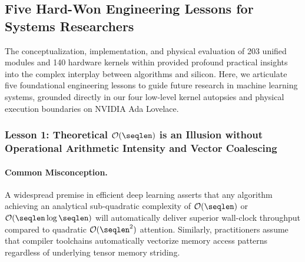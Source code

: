 \subsection{Five Hard-Won Engineering Lessons for Systems Researchers}
\label{subsec:engineering_lessons}

The conceptualization, implementation, and physical evaluation of 203 unified modules and 140 hardware kernels within \neuralops{} provided profound practical insights into the complex interplay between algorithms and silicon.
Here, we articulate five foundational engineering lessons to guide future research in machine learning systems, grounded directly in our four low-level kernel autopsies and physical execution boundaries on NVIDIA Ada Lovelace.

\subsubsection{Lesson 1: Theoretical $\mathcal{O}(\seqlen)$ is an Illusion without Operational Arithmetic Intensity and Vector Coalescing}
\label{subsubsec:lesson1}

\paragraph{Common Misconception.}
A widespread premise in efficient deep learning asserts that any algorithm achieving an analytical sub-quadratic complexity of $\mathcal{O}(\seqlen)$ or $\mathcal{O}(\seqlen \log \seqlen)$ will automatically deliver superior wall-clock throughput compared to quadratic $\mathcal{O}(\seqlen^2)$ attention.
Similarly, practitioners assume that compiler toolchains automatically vectorize memory access patterns regardless of underlying tensor memory striding.


